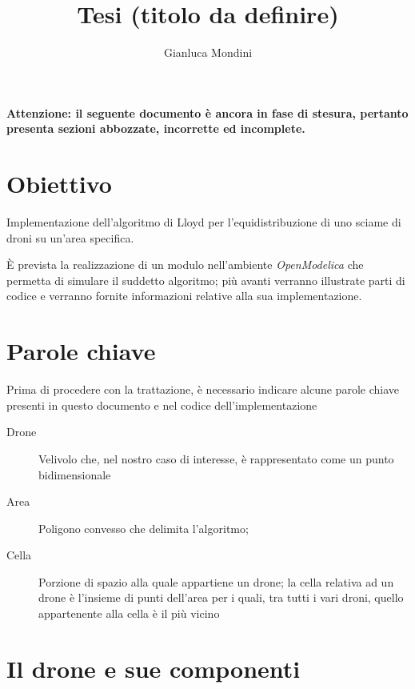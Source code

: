 \documentclass[10pt,a4paper]{article}
\author{Gianluca Mondini}
\title{Tesi (titolo da definire)}
\begin{document}
\begin{center}
\textbf{Attenzione: il seguente documento è ancora in fase di stesura, pertanto presenta sezioni abbozzate, incorrette ed incomplete.}
\end{center}

\maketitle




\section{Obiettivo}

Implementazione dell'algoritmo di Lloyd per l'equidistribuzione di uno sciame di droni su un'area specifica.

È prevista la realizzazione di un modulo nell'ambiente \textit{OpenModelica} che permetta di simulare il suddetto algoritmo; più avanti verranno illustrate parti di codice e verranno fornite informazioni relative alla sua implementazione.

\section{Parole chiave}

Prima di procedere con la trattazione, è necessario indicare alcune parole chiave presenti in questo documento e nel codice dell'implementazione

\begin{description}
	\item[Drone] Velivolo che, nel nostro caso di interesse, è rappresentato come un punto bidimensionale
	\item[Area] Poligono convesso che delimita l'algoritmo;
	\item[Cella] Porzione di spazio alla quale appartiene un drone; la cella relativa ad un drone è l'insieme di punti dell'area per i quali, tra tutti i vari droni, quello appartenente alla cella è il più vicino
\end{description}

\section{Il drone e sue componenti}
\end{document}
